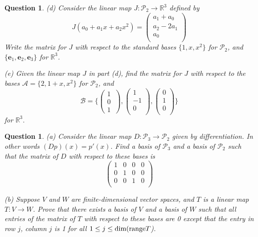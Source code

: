\documentclass[12pt]{article}
\newtheorem{question}[thm]{Question}
\def\dim{\textnormal{dim}}
\def\P{\mathcal P}
\begin{document}
\begin{question}
	\vspace{.4cm}	
		
\noindent (d) Consider the linear map $J:\P_2 \rightarrow \mathbb{R}^3$ defined by 
\[
J(a_0+a_1x+a_2x^2)= \left( \begin{array}{c}
a_1 + a_0\\
a_2-2a_1 \\
a_0 \\
 \end{array} \right)
 \]
\noindent Write the matrix for $J$ with respect to the standard bases $\{1,x,x^2\}$ for $\P_2$, and $\{\textbf{e}_1,\textbf{e}_2,\textbf{e}_3\}$ for $\mathbb{R}^3$.\\ 
 \vspace{0.5cm}

\noindent (e) Given the linear map $J$ in part (d), find the matrix for $J$ with respect to the bases $\mathcal{A} = \{2,1+x, x^2\}$ for $\P_2$, and 
\[
\mathcal{B} = \Bigg\{\left( \begin{array}{c}
1 \\
0 \\
1\
 \end{array}  \right), \left( \begin{array}{c}
1 \\
-1 \\
0\\
 \end{array} \right), \left( \begin{array}{c}
0 \\
1 \\
0\\
 \end{array} \right)\Bigg\} 
 \]
 for $\mathbb{R}^3.$

 
 
\end{question}


\vspace{.5cm}

\begin{question}

\normalfont
(a) Consider the linear map $D: \P_3 \to \P_2$ given by differentiation. In other words $(Dp)(x) = p'(x)$. Find a basis of $\P_3$ and a basis of $\P_2$ such that the matrix of $D$ with respect to these bases is 
\[
\left( \begin{array}{rrrr}
1 & 0 & 0 & 0 \\
0 & 1 & 0 & 0 \\
0 & 0 & 1 & 0 \\
\end{array}\right)
\]


\vspace{.4cm}

\noindent (b) Suppose $V$ and $W$ are finite-dimensional vector spaces, and $T$ is a linear map $T: V \to W$. Prove that there exists a basis of $V$ and a basis of $W$ such that all entries of the matrix of $T$ with respect to these bases are 0 except that the entry in row $j$, column $j$ is 1 for all $1\leq j \leq \dim (\textup{range} T$). 

\end{question}
\end{document}
